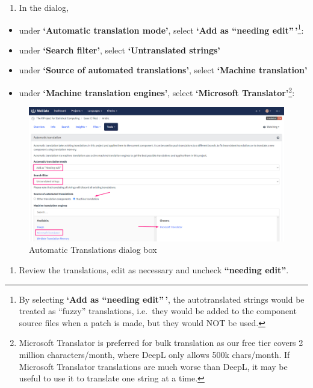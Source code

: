 \documentclass[
]{book}
\providecommand{\tightlist}{%
  \setlength{\itemsep}{0pt}\setlength{\parskip}{0pt}}
\begin{document}
\begin{enumerate}
\def\labelenumi{\arabic{enumi}.}
\setcounter{enumi}{2}
\tightlist
\item
  In the dialog,
\end{enumerate}

\begin{itemize}
\tightlist
\item
  under \textbf{`Automatic translation mode'}, select \textbf{`Add as ``needing edit''\,'}\footnote{By selecting \textbf{`Add as ``needing edit''\,'}, the autotranslated strings would be treated as ``fuzzy'' translations, i.e.~they would be added to the component source files when a patch is made, but they would NOT be used.}:
\end{itemize}

\begin{itemize}
\tightlist
\item
  under \textbf{`Search filter'}, select \textbf{`Untranslated strings'}
\item
  under \textbf{`Source of automated translations'}, select \textbf{`Machine translation'}
\item
  under \textbf{`Machine translation engines'}, select \textbf{`Microsoft Translator'}\footnote{Microsoft Translator is preferred for bulk translation as our free tier covers 2 million characters/month, where DeepL only allows 500k chars/month. If Microsoft Translator translations are much worse than DeepL, it may be useful to use it to translate one string at a time.}:
\end{itemize}

\begin{figure}
\centering
\includegraphics{img/translate_dialog.png}
\caption{Automatic Translations dialog box}
\end{figure}

\begin{enumerate}
\def\labelenumi{\arabic{enumi}.}
\setcounter{enumi}{3}
\tightlist
\item
  Review the translations, edit as necessary and uncheck \textbf{``needing edit''}.
\end{enumerate}
\end{document}
